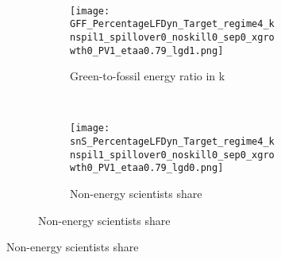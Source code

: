 \newpage
\begin{figure}[h!!!]
	\centering 	\caption{Efficient and optimal allocation: no knowledge spillovers}\label{fig:optAll_percLf_dyn_noKN_add}
	\begin{subfigure}[]{1\textwidth}	
		\centering\footnotesize{\textbf{}}\\ \vspace{2mm}
		\begin{subfigure}[]{0.4\textwidth}
			\caption{Green-to-fossil energy ratio in k }
			\texttt{[image: GFF\_PercentageLFDyn\_Target\_regime4\_knspil1\_spillover0\_noskill0\_sep0\_xgrowth0\_PV1\_etaa0.79\_lgd1.png]}
		\end{subfigure}
		\begin{minipage}[]{0.1\textwidth}
			\ 
		\end{minipage}
		\begin{subfigure}[]{0.4\textwidth}
			\caption{Non-energy scientists share }
			\texttt{[image: snS\_PercentageLFDyn\_Target\_regime4\_knspil1\_spillover0\_noskill0\_sep0\_xgrowth0\_PV1\_etaa0.79\_lgd0.png]}
		\end{subfigure}
	\end{subfigure}
\end{figure}

